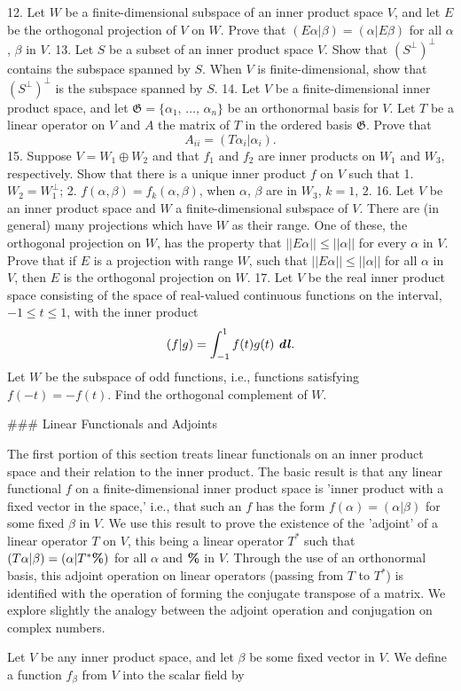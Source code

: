 12. Let \(W\) be a finite-dimensional subspace of an inner product space \(V\), and let \(E\) be the orthogonal projection of \(V\) on \(W\). Prove that \((E\alpha|\beta)=(\alpha|E\beta)\) for all \(\alpha\), \(\beta\) in \(V\).
13. Let \(S\) be a subset of an inner product space \(V\). Show that \((S^{\perp})^{\perp}\) contains the subspace spanned by \(S\). When \(V\) is finite-dimensional, show that \((S^{\perp})^{\perp}\) is the subspace spanned by \(S\).
14. Let \(V\) be a finite-dimensional inner product space, and let \(\mathfrak{G}=\{\alpha_{1},\,\ldots,\,\alpha_{n}\}\) be an orthonormal basis for \(V\). Let \(T\) be a linear operator on \(V\) and \(A\) the matrix of \(T\) in the ordered basis \(\mathfrak{G}\). Prove that \[A_{ii}=(T\alpha_{i}|\alpha_{i}).\]
15. Suppose \(V=W_{1}\oplus W_{2}\) and that \(f_{1}\) and \(f_{2}\) are inner products on \(W_{1}\) and \(W_{3}\), respectively. Show that there is a unique inner product \(f\) on \(V\) such that 1. \(W_{2}=W_{1}^{\perp}\); 2. \(f(\alpha,\beta)=f_{k}(\alpha,\beta)\), when \(\alpha\), \(\beta\) are in \(W_{3}\), \(k=1\), \(2\).
16. Let \(V\) be an inner product space and \(W\) a finite-dimensional subspace of \(V\). There are (in general) many projections which have \(W\) as their range. One of these, the orthogonal projection on \(W\), has the property that \(||E\alpha||\leq||\alpha||\) for every \(\alpha\) in \(V\). Prove that if \(E\) is a projection with range \(W\), such that \(||E\alpha||\leq||\alpha||\) for all \(\alpha\) in \(V\), then \(E\) is the orthogonal projection on \(W\).
17. Let \(V\) be the real inner product space consisting of the space of real-valued continuous functions on the interval, \(-1\leq t\leq 1\), with the inner product \[(f|g)=\int_{-1}^{1}f(t)g(t)\,\,\mbox{\boldmath$\mathit{dl}$}.\] Let \(W\) be the subspace of odd functions, i.e., functions satisfying \(f(-t)=-f(t)\). Find the orthogonal complement of \(W\).

### Linear Functionals and Adjoints

The first portion of this section treats linear functionals on an inner product space and their relation to the inner product. The basic result is that any linear functional \(f\) on a finite-dimensional inner product space is 'inner product with a fixed vector in the space,' i.e., that such an \(f\) has the form \(f(\alpha)=(\alpha|\beta)\) for some fixed \(\beta\) in \(V\). We use this result to prove the existence of the 'adjoint' of a linear operator \(T\) on \(V\), this being a linear operator \(T^{*}\) such that \((T\alpha|\beta)=(\alpha|T^{*}\mbox{\boldmath$\mathit{\char 37}$})\) for all \(\alpha\) and \(\mbox{\boldmath$\mathit{\char 37}$}\) in \(V\). Through the use of an orthonormal basis, this adjoint operation on linear operators (passing from \(T\) to \(T^{*}\)) is identified with the operation of forming the conjugate transpose of a matrix. We explore slightly the analogy between the adjoint operation and conjugation on complex numbers.

Let \(V\) be any inner product space, and let \(\beta\) be some fixed vector in \(V\). We define a function \(f_{\beta}\) from \(V\) into the scalar field by 